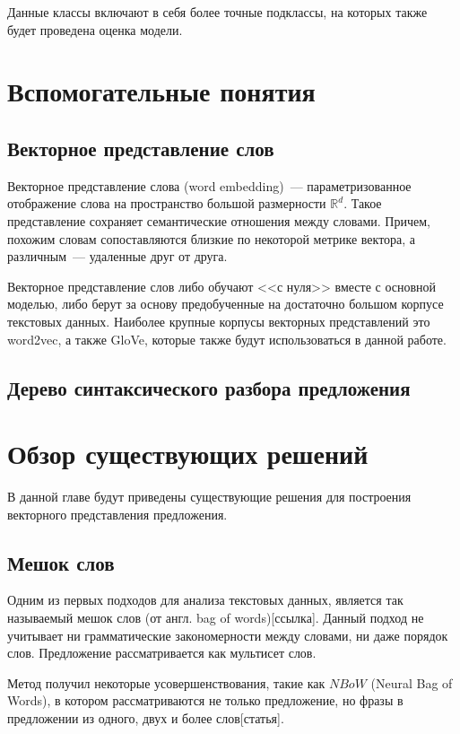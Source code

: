 Данные классы включают в себя более точные подклассы, на которых также будет проведена оценка модели.

\section{Вспомогательные понятия}

\subsection{Векторное представление слов}
Векторное представление слова (word embedding)\cite{Bengio03aneural}~--- параметризованное отображение слова на пространство большой размерности $\mathbb{R}^d$. 
Такое представление сохраняет семантические отношения между словами. 
Причем, похожим словам сопоставляются близкие по некоторой метрике вектора, 
а различным~--- удаленные друг от друга.

Векторное представление слов либо обучают <<с нуля>> вместе с основной моделью, либо берут за основу предобученные на достаточно большом корпусе текстовых данных. Наиболее крупные корпусы векторных представлений это word2vec\cite{DBLP:journals/corr/MikolovLS13, wor2vec}, а также GloVe\cite{pennington2014glove, glove}, которые также будут использоваться в данной работе.

\subsection{Дерево синтаксического разбора предложения}

\section{Обзор существующих решений}

В данной главе будут приведены существующие решения для построения векторного представления предложения.

\subsection{Мешок слов}
Одним из первых подходов для анализа текстовых данных, 
является так называемый мешок слов (от англ. bag of words)[ссылка].
Данный подход не учитывает ни грамматические закономерности между словами, ни даже порядок слов.
Предложение рассматривается как мультисет слов.

Метод получил некоторые усовершенствования, такие как $NBoW$ (Neural Bag of Words), 
в котором рассматриваются не только предложение, но фразы в предложении из одного, двух и более слов[статья].

